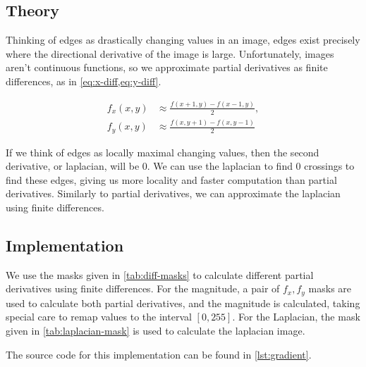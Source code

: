 \documentclass[headings=optiontoheadandtoc,listof=totoc,parskip=full]{scrartcl}
\begin{document}
\subsection{Theory}
\label{sec:gradient-theory}
Thinking of edges as drastically changing values in an image, edges exist precisely where the directional derivative of the image is large. Unfortunately, images aren't continuous functions, so we approximate partial derivatives as finite differences, as in \cref{eq:x-diff,eq:y-diff}.

\begin{align}
	f_x(x,y) &\approx \frac{f(x + 1, y) - f(x - 1, y)}{2}, \label{eq:x-diff}\\
	f_y(x,y) &\approx \frac{f(x, y + 1) - f(x, y - 1)}{2} \label{eq:y-diff}
\end{align}

If we think of edges as locally maximal changing values, then the second derivative, or laplacian, will be 0. We can use the laplacian to find 0 crossings to find these edges, giving us more locality and faster computation than partial derivatives. Similarly to partial derivatives, we can approximate the laplacian using finite differences.

\subsection{Implementation}
\label{sec:gradient-implementation}
We use the masks given in \cref{tab:diff-masks} to calculate different partial derivatives using finite differences. For the magnitude, a pair of $f_x,f_y$ masks are used to calculate both partial derivatives, and the magnitude is calculated, taking special care to remap values to the interval $[0, 255]$. For the Laplacian, the mask given in \cref{tab:laplacian-mask} is used to calculate the laplacian image.

The source code for this implementation can be found in \cref{lst:gradient}.
\end{document}
